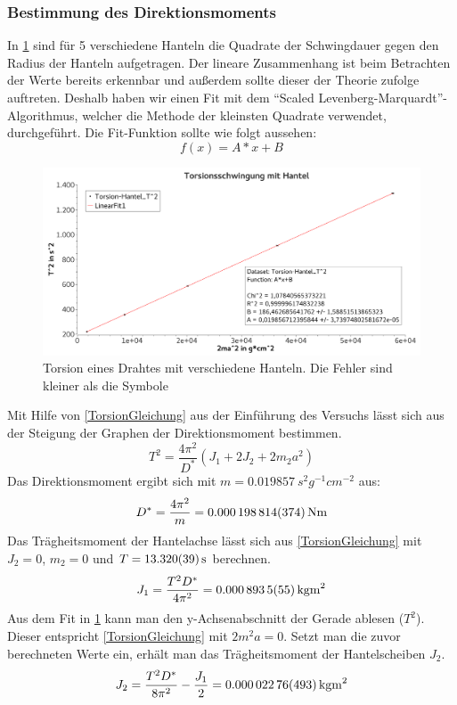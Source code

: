 \documentclass[
	a4paper,
	12pt,
	pagesize,
	ngerman
]{scrartcl}
\begin{document}
	\subsubsection*{Bestimmung des Direktionsmoments}
	In \cref{TorsionGraph} sind für 5 verschiedene Hanteln die Quadrate der Schwingdauer gegen den Radius der Hanteln aufgetragen. Der lineare Zusammenhang ist beim Betrachten der Werte bereits erkennbar und außerdem sollte dieser der Theorie zufolge auftreten. %
	Deshalb haben wir einen Fit mit dem \enquote{Scaled Levenberg-Marquardt}-Algorithmus, welcher die Methode der kleinsten Quadrate verwendet, durchgeführt. Die Fit-Funktion sollte wie folgt aussehen:
	\begin{equation}
		f(x)=A*x+B
	\end{equation}
	\begin{figure}[tb]
		\includegraphics[width=1\textwidth]{Torsion}
		\centering
		\caption{Torsion eines Drahtes mit verschiedene Hanteln. Die Fehler sind kleiner als die Symbole}
		\label{TorsionGraph}
		\centering
	\end{figure}
	Mit Hilfe von \cref{TorsionGleichung} aus der Einführung des Versuchs lässt sich aus der Steigung der Graphen der Direktionsmoment bestimmen.
	\begin{equation}
		\label{TorsionGleichung}
		T^2 = \frac{4\pi^2}{D^*} (J_1 + 2J_2 + 2m_2 a^2)
	\end{equation}
	Das Direktionsmoment ergibt sich mit $m=\SI{0,019857}{s^2g^{-1}cm^{-2}}$ aus:
	\begin{equation}
	D^* = \frac{4\pi^2}{m} = \SI{0,000198814\pm 0,000000374}{Nm} %
	\end{equation}
	Das Trägheitsmoment der Hantelachse lässt sich aus \cref{TorsionGleichung} mit $J_2=0$, $m_2=0$ und $T=\SI{13,32 \pm0,039}{s}$ berechnen.
	\begin{equation}
		J_1= \frac{T^2D^*}{4\pi^2} = \SI{0,0008935 \pm ,0000055}{kgm^2}
	\end{equation}
	Aus dem Fit in \cref{TorsionGraph} kann man den y-Achsenabschnitt der Gerade ablesen ($T^2$). Dieser entspricht \cref{TorsionGleichung} mit $2m^2a=0$. Setzt man die zuvor berechneten Werte ein, erhält man das Trägheitsmoment der Hantelscheiben $J_2$. %
	\begin{equation}
		J_2 = \frac{T^2D^*}{8\pi^2} - \frac{J_1}{2} = \SI{0,00002276 \pm 0,00000493}{kgm^2}
	\end{equation}
\end{document}
